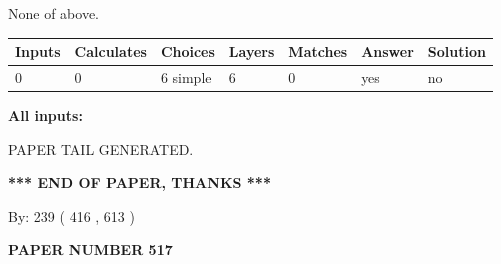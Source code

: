 \documentclass[12pt]{article}
\begin{document}
 
\noindent{}
 
 
 None of above.
 
 
\noindent{}
 
 
   
   
   
   
\noindent\begin{tabular}{|l|l|l|l|l|l|l|}
 \hline
Inputs & Calculates & Choices & Layers & Matches & Answer & Solution \\ \hline
 0  & 
 0  & 
 6
  simple  
  & 
 6  & 
 0  & 
  yes & 
  no 
  \\ \hline
 \end{tabular}
   
   
   
   
\noindent{}
   
   
   
   
\noindent\vspace{0.1in}\hspace{-0.08in} {\textbf{\Large{All inputs: }}}
   
   
   
   
   
   
 \vspace{0.2in}
 
   
   
\vspace{2.0in} PAPER TAIL GENERATED.
   
   
   
   
\vspace{1.0in} 
{\textbf{\large{ *** END OF PAPER, THANKS *** }}} 
   
   
\hspace{1.0in} By: 
 239 ( 416 ,  613 )
   
   
   
   
\newpage 
\setcounter{page}{ 
   517001 } 
   
   
   
   
 {\textbf{ \Large{ PAPER NUMBER  517  }}}
   
   
\vspace{0.2in}
   
   
   
\end{document}
